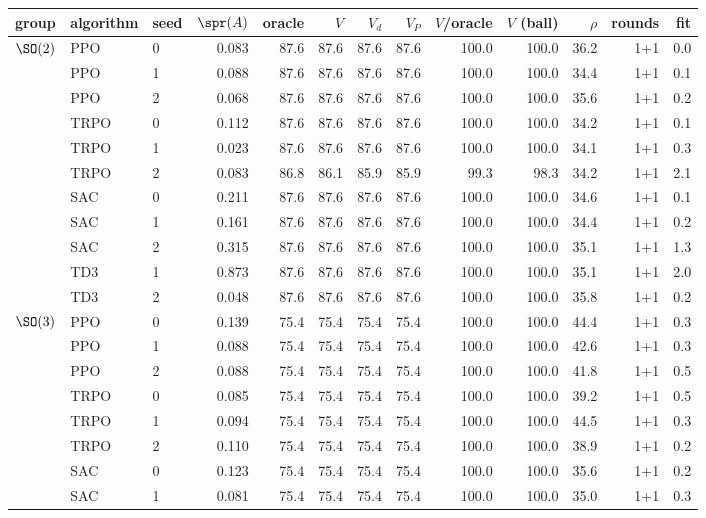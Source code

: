 \begin{tabular}{@{}lllrrrrrrrrrr@{}}
\toprule
group & algorithm & seed & $\spr(A)$ & oracle & $V$ & $V_d$ & $V_P$ & $V$/oracle & $V$ (ball) & $\rho$ & rounds & fit \\
\midrule
$\SO(2)$ & PPO & 0 & 0.083 & 87.6 & 87.6 & 87.6 & 87.6 & 100.0 & 100.0 & 36.2 & 1+1 & 0.0 \\
 & PPO & 1 & 0.088 & 87.6 & 87.6 & 87.6 & 87.6 & 100.0 & 100.0 & 34.4 & 1+1 & 0.1 \\
 & PPO & 2 & 0.068 & 87.6 & 87.6 & 87.6 & 87.6 & 100.0 & 100.0 & 35.6 & 1+1 & 0.2 \\
 & TRPO & 0 & 0.112 & 87.6 & 87.6 & 87.6 & 87.6 & 100.0 & 100.0 & 34.2 & 1+1 & 0.1 \\
 & TRPO & 1 & 0.023 & 87.6 & 87.6 & 87.6 & 87.6 & 100.0 & 100.0 & 34.1 & 1+1 & 0.3 \\
 & TRPO & 2 & 0.083 & 86.8 & 86.1 & 85.9 & 85.9 & 99.3 & 98.3 & 34.2 & 1+1 & 2.1 \\
 & SAC & 0 & 0.211 & 87.6 & 87.6 & 87.6 & 87.6 & 100.0 & 100.0 & 34.6 & 1+1 & 0.1 \\
 & SAC & 1 & 0.161 & 87.6 & 87.6 & 87.6 & 87.6 & 100.0 & 100.0 & 34.4 & 1+1 & 0.2 \\
 & SAC & 2 & 0.315 & 87.6 & 87.6 & 87.6 & 87.6 & 100.0 & 100.0 & 35.1 & 1+1 & 1.3 \\
 & TD3 & 1 & 0.873 & 87.6 & 87.6 & 87.6 & 87.6 & 100.0 & 100.0 & 35.1 & 1+1 & 2.0 \\
 & TD3 & 2 & 0.048 & 87.6 & 87.6 & 87.6 & 87.6 & 100.0 & 100.0 & 35.8 & 1+1 & 0.2 \\
\midrule
$\SO(3)$ & PPO & 0 & 0.139 & 75.4 & 75.4 & 75.4 & 75.4 & 100.0 & 100.0 & 44.4 & 1+1 & 0.3 \\
 & PPO & 1 & 0.088 & 75.4 & 75.4 & 75.4 & 75.4 & 100.0 & 100.0 & 42.6 & 1+1 & 0.3 \\
 & PPO & 2 & 0.088 & 75.4 & 75.4 & 75.4 & 75.4 & 100.0 & 100.0 & 41.8 & 1+1 & 0.5 \\
 & TRPO & 0 & 0.085 & 75.4 & 75.4 & 75.4 & 75.4 & 100.0 & 100.0 & 39.2 & 1+1 & 0.5 \\
 & TRPO & 1 & 0.094 & 75.4 & 75.4 & 75.4 & 75.4 & 100.0 & 100.0 & 44.5 & 1+1 & 0.3 \\
 & TRPO & 2 & 0.110 & 75.4 & 75.4 & 75.4 & 75.4 & 100.0 & 100.0 & 38.9 & 1+1 & 0.2 \\
 & SAC & 0 & 0.123 & 75.4 & 75.4 & 75.4 & 75.4 & 100.0 & 100.0 & 35.6 & 1+1 & 0.2 \\
 & SAC & 1 & 0.081 & 75.4 & 75.4 & 75.4 & 75.4 & 100.0 & 100.0 & 35.0 & 1+1 & 0.3 \\

\end{tabular}
